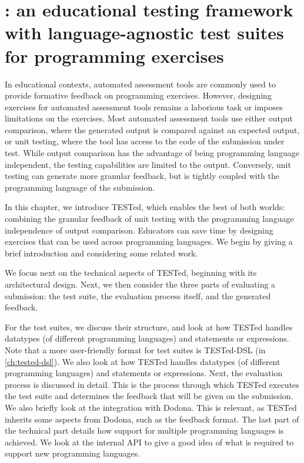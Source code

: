 \documentclass[../main]{subfiles}
\begin{document}
\chapter[\tested{}: an educational testing framework]{\tested{}: an educational testing framework with language-agnostic test suites for programming exercises}\label{ch:tested1}

In educational contexts, automated assessment tools are commonly used to provide formative feedback on programming exercises.
However, designing exercises for automated assessment tools remains a laborious task or imposes limitations on the exercises.
Most automated assessment tools use either output comparison, where the generated output is compared against an expected output, or unit testing, where the tool has access to the code of the submission under test.
While output comparison has the advantage of being programming language independent, the testing capabilities are limited to the output.
Conversely, unit testing can generate more granular feedback, but is tightly coupled with the programming language of the submission.

In this chapter, we introduce TESTed, which enables the best of both worlds: combining the granular feedback of unit testing with the programming language independence of output comparison.
Educators can save time by designing exercises that can be used across programming languages.
We begin by giving a brief introduction and considering some related work.

We focus next on the technical aspects of TESTed, beginning with its architectural design.
Next, we then consider the three parts of evaluating a submission:
the test suite, the evaluation process itself, and the generated feedback.

For the test suites, we discuss their structure, and look at how TESTed handles datatypes (of different programming languages) and statements or expressions.
Note that a more user-friendly format for test suites is TESTed-DSL (in \cref{ch:tested-dsl}).
We also look at how TESTed handles datatypes (of different programming languages) and statements or expressions.
Next, the evaluation process is discussed in detail.
This is the process through which TESTed executes the test suite and determines the feedback that will be given on the submission.
We also briefly look at the integration with Dodona.
This is relevant, as TESTed inherits some aspects from Dodona, such as the feedback format.
The last part of the technical part details how support for multiple programming languages is achieved.
We look at the internal API to give a good idea of what is required to support new programming languages.
\end{document}
